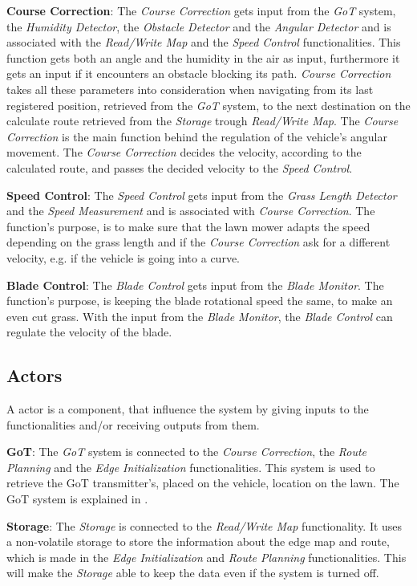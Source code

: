 \textbf{Course Correction}:
The \textit{Course Correction} gets input from the \textit{GoT} system, the \textit{Humidity Detector}, the \textit{Obstacle Detector} and the \textit{Angular Detector} and is associated with the \textit{Read/Write Map} and the \textit{Speed Control} functionalities. This function gets both an angle and the humidity in the air as input, furthermore it gets an input if it encounters an obstacle blocking its path. \textit{Course Correction} takes all these parameters into consideration when navigating from its last registered position, retrieved from the \textit{GoT} system, to the next destination on the calculate route retrieved from the \textit{Storage} trough \textit{Read/Write Map}. The \textit{Course Correction} is the main function behind the regulation of the vehicle's angular movement. The  \textit{Course Correction} decides the velocity, according to the calculated route, and passes the decided velocity to the \textit{Speed Control}.

\textbf{Speed Control}:
The \textit{Speed Control} gets input from  the \textit{Grass Length Detector} and the \textit{Speed Measurement} and is associated with \textit{Course Correction}. The function's purpose, is to make sure that the lawn mower adapts the speed depending on the grass length and if the \textit{Course Correction} ask for a different velocity, e.g. if the vehicle is going into a curve.

\textbf{Blade Control}:
The \textit{Blade Control} gets input from the \textit{Blade Monitor}. The function's purpose, is keeping the blade rotational speed the same, to make an even cut grass. With the input from the \textit{Blade Monitor}, the \textit{Blade Control} can regulate the velocity of the blade.

\subsection{Actors}
A actor is a component, that influence the system by giving inputs to the functionalities and/or receiving outputs from them.

\textbf{GoT}:
The \textit{GoT} system is connected to the \textit{Course Correction}, the \textit{Route Planning} and the \textit{Edge Initialization} functionalities. This system is used to retrieve the GoT transmitter's, placed on the vehicle, location on the lawn. The GoT system is explained in .

\textbf{Storage}:
The \textit{Storage} is connected to the \textit{Read/Write Map} functionality. It uses a non-volatile storage to store the information about the edge map and route, which is made in the \textit{Edge Initialization} and \textit{Route Planning} functionalities. This will make the \textit{Storage} able to keep the data even if the system is turned off.

